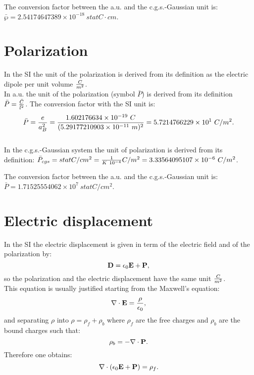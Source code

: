 \documentclass[12pt,a4paper]{article}
\def\barl{5.29177210903\times 10^{-11}}
\def\barc{1.602176634\times 10^{-19}}
\def\barpolar{5.7214766229\times 10^{1}}
\def\polartopolar{3.33564095107\times 10^{-6}}
\def\bardipcgs{2.54174647389\times 10^{-18}}
\def\barpolarcgs{1.71525554062\times 10^{7}}
\begin{document}
{\color{green} 
The conversion factor between the a.u. and the c.g.s.-Gaussian unit is: 
$\bar \wp = \bardipcgs \ statC\cdot cm$.
}

\newpage
\section{\color{coral}Polarization}
In the SI the unit of the polarization is derived from its definition as
the electric dipole per unit volume ${C \over m^2}$. 
\\

{\color{web-blue} In a.u. the unit of the polarization (symbol $\bar P$) 
is derived from its definition $\bar P={\bar C \over \bar l^2}$. The 
conversion factor with the SI unit is:
\begin{equation}
\bar P = {e \over a_B^2} =
{\barc\ C \over (\barl\ m)^2} = \barpolar\ C/m^2.
\end{equation}
}
\\

{\color{orange} In the c.g.s.-Gaussian system the unit of polarization
is derived from its definition:
$\bar P_{cgs}=statC/cm^2 = {1\over K\ 10^{-4}} C/m^2=\polartopolar\ C/m^2$. 
\\
}

{\color{green} 
The conversion factor between the a.u. and the c.g.s.-Gaussian unit is: 
$\bar P = \barpolarcgs \ statC/cm^2$.
}

\newpage
\section{\color{coral}Electric displacement}
In the SI the electric displacement is given in term of the
electric field and of the polarization by:
\begin{equation}
{\bf D}=\epsilon_0 {\bf E} + {\bf P},
\label{eldisp}
\end{equation}
so the polarization and the electric displacement have the same
unit ${C \over m^2}$. \\
This equation is usually justified starting from
the Maxwell's equation:
\begin{equation}
\nabla \cdot {\bf E} = {\rho \over \epsilon_0},
\end{equation}
and separating $\rho$ into $\rho=\rho_f + \rho_b$ where
$\rho_f$ are the free charges and $\rho_b$ are the 
bound charges such that:
\begin{equation}
\rho_b=-\nabla \cdot {\bf P}.
\end{equation}
Therefore one obtains:
\begin{equation}
\nabla \cdot (\epsilon_0 {\bf E}+ {\bf P})=\rho_f. 
\end{equation}
\\
\end{document}
